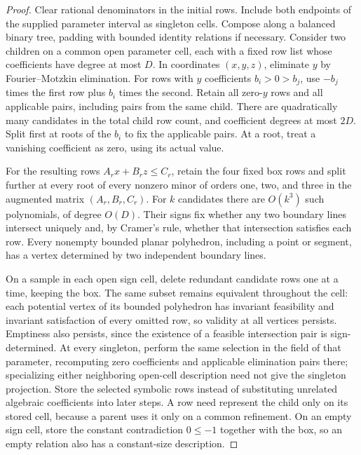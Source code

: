 \begin{proof}
Clear rational denominators in the initial rows. Include both endpoints
of the supplied parameter interval as singleton cells. Compose along a
balanced binary tree, padding with bounded identity relations if necessary.
Consider two children on a common open parameter cell, each with a fixed
row list whose coefficients have degree at most $D$. In coordinates
$(x,y,z)$, eliminate $y$ by Fourier--Motzkin elimination. For rows with
$y$ coefficients $b_i>0>b_j$, use $-b_j$ times the first row plus $b_i$
times the second. Retain all zero-$y$ rows and all applicable pairs,
including pairs from the same child. There are quadratically many
candidates in the total child row count, and coefficient degrees at most
$2D$. Split first at roots of the $b_i$ to fix the applicable pairs.
At a root, treat a vanishing coefficient as zero, using its actual value.

For the resulting rows $A_rx+B_rz\le C_r$, retain the four fixed box
rows and split further at every root of every nonzero minor of orders
one, two, and three in the augmented matrix $(A_r,B_r,C_r)$. For $k$
candidates there are $O(k^3)$ such polynomials, of degree $O(D)$.
Their signs fix whether any two boundary lines intersect uniquely and,
by Cramer's rule, whether that intersection satisfies each row. Every
nonempty bounded planar polyhedron, including a point or segment, has
a vertex determined by two independent boundary lines.

On a sample in each open sign cell, delete redundant candidate rows
one at a time, keeping the box. The same subset remains equivalent throughout the
cell: each potential vertex of its bounded polyhedron has invariant
feasibility and invariant satisfaction of every omitted row, so
validity at all vertices persists. Emptiness also persists, since the
existence of a feasible intersection pair is sign-determined. At every
singleton, perform the same selection in the field of that parameter,
recomputing zero coefficients and applicable elimination
pairs there; specializing either neighboring open-cell description
need not give the singleton projection. Store the selected symbolic rows
instead of substituting unrelated algebraic coefficients into later
steps. A row need represent the child only on its stored
cell, because a parent uses it only on a common refinement.
On an empty sign cell,
store the constant contradiction $0\le-1$ together with the box,
so an empty relation also has a constant-size description.


\end{proof}
